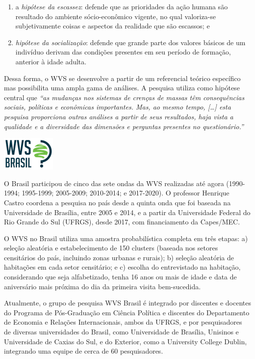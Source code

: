 \documentclass[
  10pt,
  brazil,
  a4paper,
  twoside, notitlepage, openright]{book}
\providecommand{\tightlist}{%
  \setlength{\itemsep}{0pt}\setlength{\parskip}{0pt}}
\begin{document}
\begin{enumerate}
\def\labelenumi{\alph{enumi})}
\tightlist
\item
  a \emph{hipótese da escassez}: defende que as prioridades da ação humana são resultado do ambiente sócio-econômico vigente, no qual valoriza-se subjetivamente coisas e aspectos da realidade que são escassos; e\\
\item
  \emph{hipótese da socialização}: defende que grande parte dos valores básicos de um indivíduo derivam das condições presentes em seu período de formação, anterior à idade adulta.
\end{enumerate}

Dessa forma, o WVS se desenvolve a partir de um referencial teórico específico mas possibilita uma ampla gama de análises. A pesquisa utiliza como hipótese central que \emph{``as mudanças nos sistemas de crenças de massas têm consequências sociais, políticas e econômicas importantes\emph{. Mas, ao mesmo tempo, }{[}\ldots{]} esta pesquisa proporciona outras análises a partir de seus resultados, haja vista a qualidade e a diversidade das dimensões e perguntas presentes no questionário.''} \citep{castro_conteudo_2015}

\includegraphics{img/wvs_logo.png}

O Brasil participou de cinco das sete ondas da WVS realizadas até agora (1990-1994; 1995-1999; 2005-2009; 2010-2014; e 2017-2020). O professor Henrique Castro coordena a pesquisa no país desde a quinta onda que foi baseada na Universidade de Brasília, entre 2005 e 2014, e a partir da Universidade Federal do Rio Grande do Sul (UFRGS), desde 2017, com financiamento da Capes/MEC.

O WVS no Brasil utiliza uma amostra probabilística completa em três etapas: a) seleção aleatória e estabelecimento de 150 clusters (baseada nos setores censitários do país, incluindo zonas urbanas e rurais); b) seleção aleatória de habitações em cada setor censitário; e c) escolha do entrevistado na habitação, considerando que seja alfabetizado, tenha 16 anos ou mais de idade e data de aniversário mais próxima do dia da primeira visita bem-sucedida.

Atualmente, o grupo de pesquisa WVS Brasil é integrado por discentes e docentes do Programa de Pós-Graduação em Ciência Política e discentes do Departamento de Economia e Relações Internacionais, ambos da UFRGS, e por pesquisadores de diversas universidades do Brasil, como Universidade de Brasília, Unisinos e Universidade de Caxias do Sul, e do Exterior, como a University College Dublin, integrando uma equipe de cerca de 60 pesquisadores.
\end{document}
